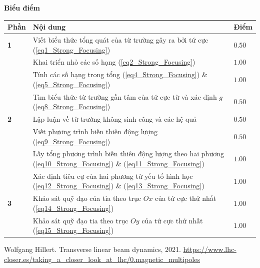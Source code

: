 \textbf{Biểu điểm}
\begin{center}
\begin{tabular}{|>{\centering\arraybackslash}m{1cm}|>{\raggedright\arraybackslash}m{14cm}| >{\centering\arraybackslash}m{1cm}|}
    \hline
    \textbf{Phần} & \textbf{Nội dung} & \textbf{Điểm} \\
    \hline
    \textbf{1} & Viết biểu thức tổng quát của từ trường gây ra bởi tứ cực (\ref{eq1_Strong_Focusing}) & $0.50$ \\
    \cline{2-3}
    & Khai triển nhỏ các số hạng (\ref{eq2_Strong_Focusing}) & $1.00$ \\
    \cline{2-3}
    & Tính các số hạng trong tổng (\ref{eq4_Strong_Focusing}) \& (\ref{eq5_Strong_Focusing}) & $1.00$ \\
    \cline{2-3}
    & Tìm biểu thức từ trường gần tâm của tứ cực từ và xác định $g$ (\ref{eq8_Strong_Focusing}) & $0.50$ \\
    \hline
    \textbf{2} & Lập luận về từ trường không sinh công và các hệ quả & $0.50$ \\
    \cline{2-3}
    & Viết phương trình biến thiên động lượng (\ref{eq9_Strong_Focusing}) & $0.50$ \\
    \cline{2-3}
    & Lấy tổng phương trình biến thiên động lượng theo hai phương (\ref{eq10_Strong_Focusing}) \& (\ref{eq11_Strong_Focusing}) & $1.00$ \\
    \cline{2-3}
    & Xác định tiêu cự của hai phương từ yếu tố hình học (\ref{eq12_Strong_Focusing}) \& (\ref{eq13_Strong_Focusing}) & $1.00$ \\
    \hline
    \textbf{3} & Khảo sát quỹ đạo của tia theo trục $Ox$ của tứ cực thứ nhất (\ref{eq14_Strong_Focusing}) & $1.00$ \\
    \cline{2-3}
    & Khảo sát quỹ đạo tia theo trục $Oy$ của tứ cực thứ nhất (\ref{eq15_Strong_Focusing}) & $1.00$ \\
    \hline
\end{tabular}
\end{center}



\begin{thebibliography}{}
 Wolfgang Hillert. Transverse linear beam dynamics, 2021.
 \href{https://www.lhc-closer.es/taking_a_closer_look_at_lhc/0.magnetic_multipoles}{https://www.lhc-closer.es/taking\_a\_closer\_look\_at\_lhc/0.magnetic\_multipoles}
\end{thebibliography}